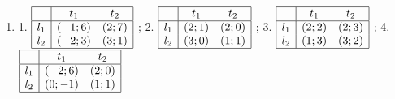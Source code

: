 \begin{problem}
\begin{enumerate}
\item 	1.  $\begin{array}{|c|cc|}  \hline {} & {t_{1} } & {t_{2} } \\  \hline {l_{1} } & {\left(-1;6\right)} & {\left(2;7\right)} \\ {l_{2} } & {\left(-2;3\right)} & {\left(3;1\right)} \\  \hline  \end{array}$ ; 2.  $\begin{array}{|c|cc|}  \hline {} & {t_{1} } & {t_{2} } \\  \hline {l_{1} } & {\left(2;1\right)} & {\left(2;0\right)} \\ {l_{2} } & {\left(3;0\right)} & {\left(1;1\right)} \\  \hline  \end{array}$ ; 3.  $\begin{array}{|c|cc|}  \hline {} & {t_{1} } & {t_{2} } \\  \hline {l_{1} } & {\left(2;2\right)} & {\left(2;3\right)} \\ {l_{2} } & {\left(1;3\right)} & {\left(3;2\right)} \\  \hline  \end{array}$ ; 4.  $\begin{array}{|c|cc|}  \hline {} & {t_{1} } & {t_{2} } \\  \hline {l_{1} } & {\left(-2;6\right)} & {\left(2;0\right)} \\ {l_{2} } & {\left(0;-1\right)} & {\left(1;1\right)} \\  \hline  \end{array}$ \\

\end{enumerate}
\end{problem}
